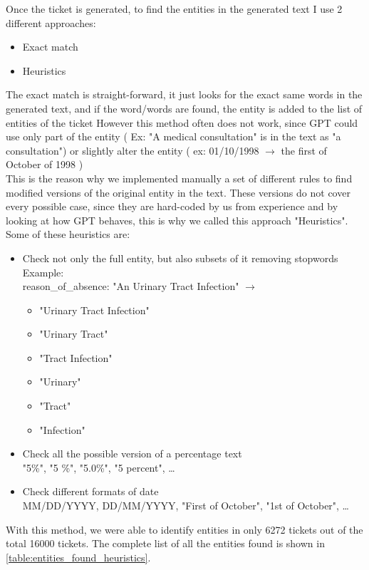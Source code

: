 Once the ticket is generated, to find the entities in the generated text I use 2 different approaches:
\begin{itemize}
    \item Exact match
    \item Heuristics
\end{itemize}
The exact match is straight-forward, it just looks for the exact same words in the generated text, and if the word/words are found, the entity is added to the list of entities of the ticket
However this method often does not work, since GPT could use only part of the entity ( Ex: "A medical consultation" is in the text as "a consultation") or slightly alter the entity ( ex: 01/10/1998 $\rightarrow$ the first of October of 1998 ) \\
This is the reason why we implemented manually a set of different rules to find modified versions of the original entity in the text. These versions do not cover every possible case, since they are hard-coded by us from experience and by looking at how GPT behaves, this is why we called this approach "Heuristics". \\
Some of these heuristics are:
\begin{itemize}
    \item Check not only the full entity, but also subsets of it removing stopwords\\
    Example: \\
    reason\_of\_absence: "An Urinary Tract Infection" $\rightarrow$
                 \begin{itemize}
                    \item "Urinary Tract Infection"
                    \item "Urinary Tract"
                    \item "Tract Infection"
                    \item "Urinary"
                    \item "Tract"
                    \item "Infection"
                \end{itemize}
    \item Check all the possible version of a percentage text\\
    "5\%", "5 \%", "5.0\%", "5 percent", \dots
    \item Check different formats of date\\
    MM/DD/YYYY, DD/MM/YYYY, "First of October", "1st of October", \dots

\end{itemize}
With this method, we were able to identify entities in only 6272 tickets out of the total 16000 tickets. The complete list of all the entities found is shown in \autoref{table:entities_found_heuristics}.

